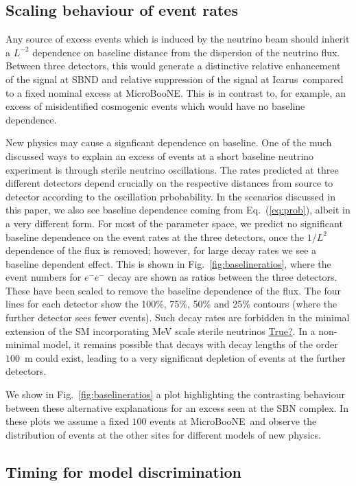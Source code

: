 \documentclass[11pt, a4paper]{article}
\newcommand{\refeq}[1]{Eq.~(\ref{#1})}
\newcommand{\reffig}[1]{Fig.~\ref{#1}}
\def\muboone{MicroBooNE}
\def\icarus{Icarus}
\newcommand{\newtext}[2]{\textcolor{#1}{\ul{#2}}}
\begin{document}
\subsection{Scaling behaviour of event rates}

Any source of excess events which is induced by the neutrino beam should
inherit a $L^{-2}$ dependence on baseline distance from the dispersion of the
neutrino flux. Between three detectors, this would generate a distinctive
relative enhancement of the signal at SBND and relative suppression of the
signal at \icarus\ compared to a fixed nominal excess at \muboone. This is in
contrast to, for example, an excess of misidentified cosmogenic events which
would have no baseline dependence.

New physics may cause a signficant dependence on baseline. One of the much
discussed ways to explain an excess of events at a short baseline neutrino
experiment is through sterile neutrino oscillations. The rates predicted at
three different detectors depend crucially on the respective distances from
source to detector according to the oscillation prbobability. In the scenarios
discussed in this paper, we also see baseline dependence coming from
\refeq{eq:prob}, albeit in a very different form. For most of the parameter
space, we predict no significant baseline dependence on the event rates
at the three detectors, once the $1/L^2$ dependence of the flux is removed;
however, for large decay rates we see a baseline dependent effect. This is
shown in \reffig{fig:baselineratios}, where the event numbers for $e^-e^-$
decay are shown as ratios between the three detectors. These have been scaled
to remove the baseline dependence of the flux.  The four lines for each
detector show the 100\%, 75\%, 50\% and 25\% contours (where the further
detector sees fewer events). Such decay rates are forbidden in the minimal
extension of the SM incorporating MeV scale sterile neutrinos
\newtext{PB}{True?}. In a non-minimal model, it remains possible that decays
with decay lengths of the order $100$~m could exist, leading to a very 
significant depletion of events at the further detectors.

We show in \reffig{fig:baselineratios} a plot highlighting the contrasting
behaviour between these alternative explanations for an excess seen at the SBN
complex. In these plots we assume a fixed $100$ events at \muboone\ and observe
the distribution of events at the other sites for different models of new
physics.

\subsection{\label{sec:timing_physics}Timing for model discrimination}
\end{document}
